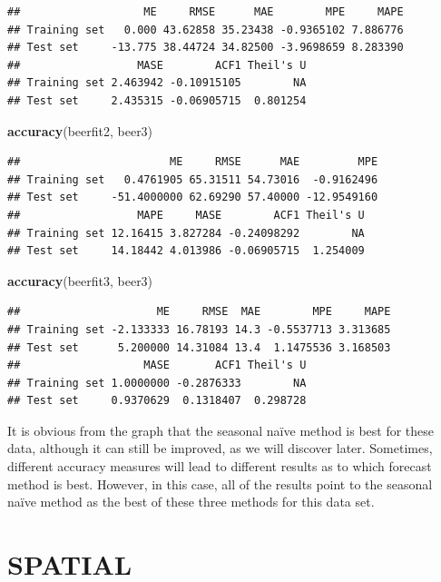 \documentclass[
]{article}
\newenvironment{Shaded}{\begin{snugshade}}{\end{snugshade}}
\newcommand{\KeywordTok}[1]{\textcolor[rgb]{0.13,0.29,0.53}{\textbf{#1}}}
\newcommand{\NormalTok}[1]{#1}
\begin{document}
\begin{verbatim}
##                   ME     RMSE      MAE        MPE     MAPE
## Training set   0.000 43.62858 35.23438 -0.9365102 7.886776
## Test set     -13.775 38.44724 34.82500 -3.9698659 8.283390
##                  MASE        ACF1 Theil's U
## Training set 2.463942 -0.10915105        NA
## Test set     2.435315 -0.06905715  0.801254
\end{verbatim}

\begin{Shaded}
\begin{Highlighting}[]
\KeywordTok{accuracy}\NormalTok{(beerfit2, beer3)}
\end{Highlighting}
\end{Shaded}

\begin{verbatim}
##                       ME     RMSE      MAE         MPE
## Training set   0.4761905 65.31511 54.73016  -0.9162496
## Test set     -51.4000000 62.69290 57.40000 -12.9549160
##                  MAPE     MASE        ACF1 Theil's U
## Training set 12.16415 3.827284 -0.24098292        NA
## Test set     14.18442 4.013986 -0.06905715  1.254009
\end{verbatim}

\begin{Shaded}
\begin{Highlighting}[]
\KeywordTok{accuracy}\NormalTok{(beerfit3, beer3)}
\end{Highlighting}
\end{Shaded}

\begin{verbatim}
##                     ME     RMSE  MAE        MPE     MAPE
## Training set -2.133333 16.78193 14.3 -0.5537713 3.313685
## Test set      5.200000 14.31084 13.4  1.1475536 3.168503
##                   MASE       ACF1 Theil's U
## Training set 1.0000000 -0.2876333        NA
## Test set     0.9370629  0.1318407  0.298728
\end{verbatim}

It is obvious from the graph that the seasonal naïve method is best for
these data, although it can still be improved, as we will discover
later. Sometimes, different accuracy measures will lead to different
results as to which forecast method is best. However, in this case, all
of the results point to the seasonal naïve method as the best of these
three methods for this data set.

\hypertarget{spatial}{%
\section{\texorpdfstring{\textbf{SPATIAL}}{SPATIAL}}\label{spatial}}
\end{document}
